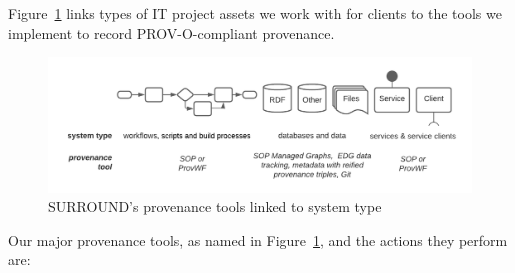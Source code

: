 \documentclass[letterpaper,twocolumn,10pt]{article}
\begin{document}
Figure~\ref{fig:overview} links types of IT project assets we work with for clients to the tools we implement
to record PROV-O-compliant provenance. 

\begin{figure}
  \begin{center}
    \includegraphics[width=\textwidth]{images/overview.png}
  \end{center}
  \caption{\label{fig:overview} SURROUND's provenance tools linked to system type}
  \end{figure}

Our major provenance tools, as named in Figure~\ref{fig:overview}, and the actions they perform are:
\end{document}
